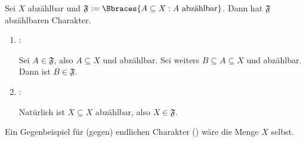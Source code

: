 \begin{solution}
\begin{enumerate}[label = \arabic*.]
  Sei $X$ abzählbar und $\mathfrak{F} := \Bbraces{A \subseteq X: A ~\text{abzählbar}}$.
  Dann hat $\mathfrak{F}$ abzählbaren Charakter.

  \begin{enumerate}[label = \texttt{ad}]

    \item \Quote{$\to$}:

    Sei $A \in \mathfrak{F}$, also $A \subseteq X$ und abzählbar.
    Sei weiters $B \subseteq A \subseteq X$ und abzählbar.
    Dann ist $B \in \mathfrak{F}$.

    \item \Quote{$\leftarrow$}:

    Natürlich ist $X \subseteq X$ abzählbar, also $X \in \mathfrak{F}$.

  \end{enumerate}

  Ein Gegenbeispiel für (gegen) endlichen Charakter (\Quote{$\not \leftarrow$}) wäre die Menge $X$ selbst.

\end{enumerate}

\end{solution}

